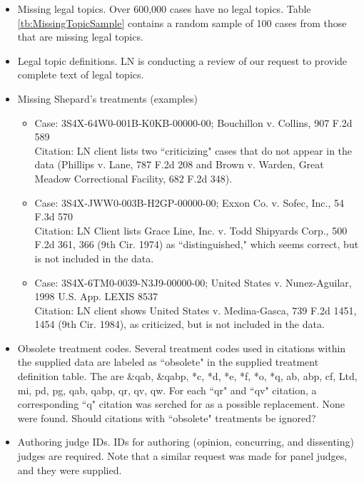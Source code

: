 \documentclass[10pt, letterpaper]{article}
\begin{document}
\begin{spacing}{1.0}
\begin{itemize}
\begin{itemize}
    \end{itemize}

    \item Missing legal topics.  Over 600,000 cases have no legal topics.  Table \ref{tb:MissingTopicSample} contains a random sample of 100 cases from those that are missing legal topics.
    
    \item Legal topic definitions.  LN is conducting a review of our request to provide complete text of legal topics.

    \item Missing Shepard's treatments (examples)
    \begin{itemize}
        \item Case: 3S4X-64W0-001B-K0KB-00000-00; Bouchillon v. Collins, 907 F.2d 589\\
        Citation: LN client lists two ``criticizing" cases that do not appear in the data (Phillips v. Lane, 787 F.2d 208 and Brown v. Warden, Great Meadow Correctional Facility, 682 F.2d 348).
        
        \item Case: 3S4X-JWW0-003B-H2GP-00000-00; Exxon Co. v. Sofec, Inc., 54 F.3d 570\\
        Citation:  LN Client lists Grace Line, Inc. v. Todd Shipyards Corp., 500 F.2d 361, 366 (9th Cir. 1974) as ``distinguished," which seems correct, but is not included in the data.
        
        \item Case: 3S4X-6TM0-0039-N3J9-00000-00; United States v. Nunez-Aguilar, 1998 U.S. App. LEXIS 8537\\
        Citation: LN client shows United States v. Medina-Gasca, 739 F.2d 1451, 1454 (9th Cir. 1984), as criticized, but is not included in the data.
    \end{itemize}

    \item Obsolete treatment codes.  Several treatment codes used in citations within the supplied data are labeled as ``obsolete" in the supplied treatment definition table.  The are \&qab, \&qabp, *c, *d, *e, *f, *o, *q, ab,  abp, cf, Ltd, mi, pd, pg, qab, qabp, qr, qv, qw.  For each ``qr" and ``qv" citation, a corresponding ``q" citation was serched for as a possible replacement.  None were found.  Should citations with ``obsolete" treatments be ignored?
    
    \item Authoring judge IDs.  IDs for authoring (opinion, concurring, and dissenting) judges are required.  Note that a similar request was made for panel judges, and they were supplied.
    

\end{itemize}
\end{spacing}
\end{document}
